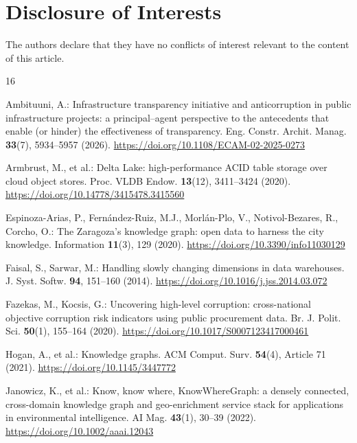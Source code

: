 \documentclass[runningheads]{llncs}
\renewcommand{\_}{\origunderscore\allowbreak}
\begin{document}
\section*{Disclosure of Interests}
The authors declare that they have no conflicts of interest relevant to the content
of this article.

\begingroup\scriptsize\setlength{\parskip}{0pt}\linespread{0.92}\selectfont
\begin{thebibliography}{16}

Ambituuni, A.: Infrastructure transparency initiative and anticorruption in public infrastructure projects: a principal--agent perspective to the antecedents that enable (or hinder) the effectiveness of transparency. Eng. Constr. Archit. Manag. \textbf{33}(7), 5934--5957 (2026). \url{https://doi.org/10.1108/ECAM-02-2025-0273}

Armbrust, M., et al.: Delta Lake: high-performance ACID table storage over cloud object stores. Proc. VLDB Endow. \textbf{13}(12), 3411--3424 (2020). \url{https://doi.org/10.14778/3415478.3415560}

Espinoza-Arias, P., Fern\'andez-Ruiz, M.J., Morl\'an-Plo, V., Notivol-Bezares, R., Corcho, O.: The Zaragoza's knowledge graph: open data to harness the city knowledge. Information \textbf{11}(3), 129 (2020). \url{https://doi.org/10.3390/info11030129}

Faisal, S., Sarwar, M.: Handling slowly changing dimensions in data warehouses. J. Syst. Softw. \textbf{94}, 151--160 (2014). \url{https://doi.org/10.1016/j.jss.2014.03.072}

Fazekas, M., Kocsis, G.: Uncovering high-level corruption: cross-national objective corruption risk indicators using public procurement data. Br. J. Polit. Sci. \textbf{50}(1), 155--164 (2020). \url{https://doi.org/10.1017/S0007123417000461}

Hogan, A., et al.: Knowledge graphs. ACM Comput. Surv. \textbf{54}(4), Article 71 (2021). \url{https://doi.org/10.1145/3447772}

Janowicz, K., et al.: Know, know where, KnowWhereGraph: a densely connected, cross-domain knowledge graph and geo-enrichment service stack for applications in environmental intelligence. AI Mag. \textbf{43}(1), 30--39 (2022). \url{https://doi.org/10.1002/aaai.12043}


\end{thebibliography}
\end{document}
